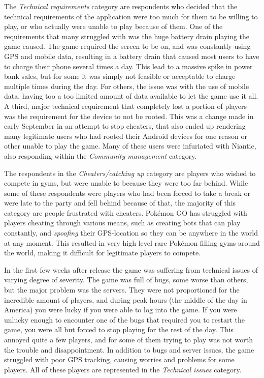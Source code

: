 The \emph{Technical requirements} category are respondents who decided that the technical requirements of the application were too much for them to be willing to play, or who actually were unable to play because of them. One of the requirements that many struggled with was the huge battery drain playing the game caused. The game required the screen to be on, and was constantly using GPS and mobile data, resulting in a battery drain that caused most users to have to charge their phone several times a day. This lead to a massive spike in power bank sales, but for some it was simply not feasible or acceptable to charge multiple times during the day. For others, the issue was with the use of mobile data, having too a too limited amount of data available to let the game use it all. A third, major technical requirement that completely lost a portion of players was the requirement for the device to not be rooted. This was a change made in early September in an attempt to stop cheaters, that also ended up rendering many legitimate users who had rooted their Android devices for one reason or other unable to play the game. Many of these users were infuriated with Niantic, also responding within the \emph{Community management} category.

The respondents in the \emph{Cheaters/catching up} category are players who wished to compete in gyms, but were unable to because they were too far behind. While some of these respondents were players who had been forced to take a break or were late to the party and fell behind because of that, the majority of this category are people frustrated with cheaters. Pokémon GO has struggled with players cheating through various means, such as creating bots that can play constantly, and \emph{spoofing} their GPS-location so they can be anywhere in the world at any moment. This resulted in very high level rare Pokémon filling gyms around the world, making it difficult for legitimate players to compete.

In the first few weeks after release the game was suffering from technical issues of varying degree of severity. The game was full of bugs, some worse than others, but the major problem was the servers. They were not proportioned for the incredible amount of players, and during peak hours (the middle of the day in America) you were lucky if you were able to log into the game. If you were unlucky enough to encounter one of the bugs that required you to restart the game, you were all but forced to stop playing for the rest of the day. This annoyed quite a few players, and for some of them trying to play was not worth the trouble and disappointment. In addition to bugs and server issues, the game struggled with poor GPS tracking, causing worries and problems for some players. All of these players are represented in the \emph{Technical issues} category.

